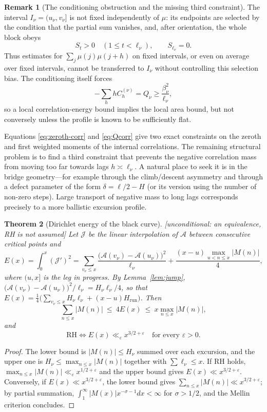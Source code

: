 \documentclass[11pt,reqno]{amsart}
\theoremstyle{plain}
\newtheorem{theorem}{Theorem}[section]
\theoremstyle{definition}
\newtheorem{remark}[theorem]{Remark}
\newcommand{\Anet}{\mathcal{A}}
\newcommand{\eps}{\varepsilon}
\begin{document}
\begin{remark}[The conditioning obstruction and the missing third constraint]
\label{rem:conditioning}
The interval $I_\nu=(u_\nu,v_\nu]$ is not fixed independently of $\mu$:
its endpoints are selected by the condition that the partial sum vanishes,
and, after orientation, the whole block obeys
\[
  S_t>0\quad(1\le t<\ell_\nu),\qquad S_{\ell_\nu}=0.
\]
Thus estimates for $\sum_j\mu(j)\mu(j+h)$ on fixed intervals, or even on
average over fixed intervals, cannot be transferred to $I_\nu$ without
controlling this selection bias.  The conditioning itself forces
\[
  -\sum_hhC_h^{(\nu)}=Q_\nu\ge \frac{\beta_\nu^2}{\ell_\nu},
\]
so a local correlation-energy bound implies the local area bound, but not
conversely unless the profile is known to be sufficiently flat.

Equations \eqref{eq:zeroth-corr} and \eqref{eq:Qcorr} give two exact
constraints on the zeroth and first weighted moments of the internal
correlations.  The remaining structural problem is to find a third
constraint that prevents the negative correlation mass from moving too far
towards lags $h\asymp\ell_\nu$.  A natural place to seek it is in the bridge
geometry---for example through the climb/descent asymmetry and through a
defect parameter of the form $\delta=\ell/2-H$ (or its version using the
number of non-zero steps).  Large transport of negative mass to long lags
corresponds precisely to a more ballistic excursion profile.
\end{remark}

\begin{theorem}[Dirichlet energy of the black curve]
\label{thm:energy}
\emph{[unconditional: an equivalence, RH is not assumed]} Let $\mathcal{J}$
be the linear interpolation of $\Anet$ between consecutive critical points
and
\[
  E(x)=\int_0^x(\mathcal{J}')^2
  =\sum_{v_\nu\le x}\frac{\bigl(\Anet(v_\nu)-\Anet(u_\nu)\bigr)^2}{\ell_\nu}
  +\frac{(x-u)\max_{u<n\le x}|M(n)|}{4},
\]
where $(u,x]$ is the leg in progress. By Lemma~\ref{lem:jump},
$\bigl(\Anet(v_\nu)-\Anet(u_\nu)\bigr)^2/\ell_\nu=H_\nu\ell_\nu/4$, so that
$E(x)=\tfrac14\bigl(\sum_{v_\nu\le x}H_\nu\ell_\nu+(x-u)H_{\mathrm{run}}\bigr)$.
Then
\[
  \sum_{n\le x}|M(n)|\ \le\ 4E(x)\ \le\ x\max_{n\le x}|M(n)|,
\]
and
\[
  \mathrm{RH}\iff E(x)\ll_\eps x^{3/2+\eps}\quad\text{for every }\eps>0 .
\]
\end{theorem}

\begin{proof}
The lower bound is $|M(n)|\le H_\nu$ summed over each excursion, and the
upper one is $H_\nu\le\max_{n\le x}|M(n)|$ together with
$\sum\ell_\nu\le x$. If RH holds, $\max_{n\le x}|M(n)|\ll_\eps x^{1/2+\eps}$
and the upper bound gives $E(x)\ll x^{3/2+\eps}$. Conversely, if
$E(x)\ll x^{3/2+\eps}$, the lower bound gives
$\sum_{n\le x}|M(n)|\ll x^{3/2+\eps}$; by partial summation,
$\int_1^\infty|M(x)|x^{-\sigma-1}dx<\infty$ for $\sigma>1/2$, and the Mellin
criterion concludes.
\end{proof}
\end{document}
